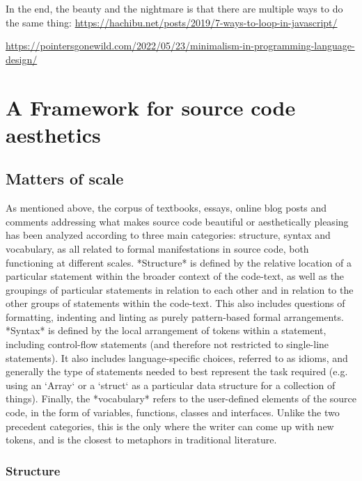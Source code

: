 In the end, the beauty and the nightmare is that there are multiple ways to do the same thing: \url{https://hachibu.net/posts/2019/7-ways-to-loop-in-javascript/}

\url{https://pointersgonewild.com/2022/05/23/minimalism-in-programming-language-design/}

\section{A Framework for source code aesthetics}
\label{sec:programming-aesthetic-framework}

\subsection{Matters of scale}
\label{subsec:matters-of-scale}

As mentioned above, the corpus of textbooks, essays, online blog posts and comments addressing what makes source code beautiful or aesthetically pleasing has been analyzed according to three main categories: structure, syntax and vocabulary, as all related to formal manifestations in source code, both functioning at different scales. *Structure* is defined by the relative location of a particular statement within the broader context of the code-text, as well as the groupings of particular statements in relation to each other and in relation to the other groups of statements within the code-text. This also includes questions of formatting, indenting and linting as purely pattern-based formal arrangements. *Syntax* is defined by the local arrangement of tokens within a statement, including control-flow statements (and therefore not restricted to single-line statements). It also includes language-specific choices, referred to as idioms, and generally the type of statements needed to best represent the task required (e.g. using an `Array` or a `struct` as a particular data structure for a collection of things). Finally, the *vocabulary* refers to the user-defined elements of the source code, in the form of variables, functions, classes and interfaces. Unlike the two precedent categories, this is the only where the writer can come up with new tokens, and is the closest to metaphors in traditional literature.

\subsubsection{Structure}
\label{subsubsec:framework-structure}

